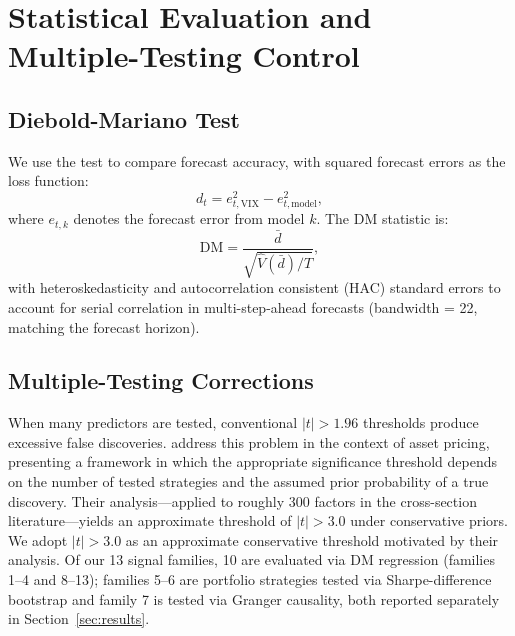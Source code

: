 \documentclass[12pt,a4paper]{article}
\begin{document}
\section{Statistical Evaluation and Multiple-Testing Control}
\label{sec:evaluation}

\subsection{Diebold-Mariano Test}

We use the \citet{diebold1995} test to compare forecast accuracy, with squared forecast errors as the loss function:
\begin{equation}
d_t = e_{t,\text{VIX}}^2 - e_{t,\text{model}}^2,
\label{eq:dm}
\end{equation}
where $e_{t,k}$ denotes the forecast error from model $k$. The DM statistic is:
\begin{equation}
\text{DM} = \frac{\bar{d}}{\sqrt{\hat{V}(\bar{d})/T}},
\label{eq:dm_stat}
\end{equation}
with \citet{newey1987} heteroskedasticity and autocorrelation consistent (HAC) standard errors to account for serial correlation in multi-step-ahead forecasts (bandwidth = 22, matching the forecast horizon).

\subsection{Multiple-Testing Corrections}
\label{sec:multiple_testing}

When many predictors are tested, conventional $|t| > 1.96$ thresholds produce excessive false discoveries. \citet{harvey2016} address this problem in the context of asset pricing, presenting a framework in which the appropriate significance threshold depends on the number of tested strategies and the assumed prior probability of a true discovery. Their analysis---applied to roughly 300 factors in the cross-section literature---yields an approximate threshold of $|t| > 3.0$ under conservative priors. We adopt $|t| > 3.0$ as an approximate conservative threshold motivated by their analysis. Of our 13 signal families, 10 are evaluated via DM regression (families 1--4 and 8--13); families 5--6 are portfolio strategies tested via Sharpe-difference bootstrap and family 7 is tested via Granger causality, both reported separately in Section~\ref{sec:results}.
\end{document}
